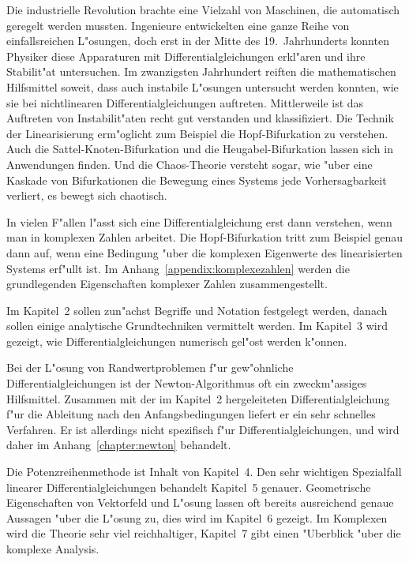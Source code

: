 Die industrielle Revolution brachte eine Vielzahl von Maschinen,
%
die automatisch geregelt werden mussten.
Ingenieure entwickelten eine ganze Reihe von einfallsreichen L"osungen,
doch erst in der Mitte des 19.~Jahrhunderts konnten Physiker diese
Apparaturen mit Differentialgleichungen erkl"aren und ihre Stabilit"at
untersuchen.
Im zwanzigsten Jahrhundert reiften die mathematischen Hilfsmittel
soweit, dass auch instabile L"osungen untersucht werden konnten,
wie sie bei nichtlinearen Differentialgleichungen auftreten.
Mittlerweile ist das Auftreten von Instabilit"aten recht gut verstanden
und klassifiziert. 
Die Technik der Linearisierung erm"oglicht zum Beispiel die
Hopf-Bifurkation zu verstehen.
%
%
Auch die Sattel-Knoten-Bifurkation und die Heugabel-Bifurkation
lassen sich in Anwendungen finden.
%
%
%
%
Und die Chaos-Theorie versteht sogar, wie "uber eine Kaskade von
Bifurkationen die Bewegung eines Systems jede Vorhersagbarkeit verliert,
es bewegt sich chaotisch.
%

In vielen F"allen l"asst sich eine Differentialgleichung erst dann
verstehen, wenn man in komplexen Zahlen arbeitet. 
Die Hopf-Bifurkation tritt zum Beispiel genau dann auf, wenn eine
Bedingung "uber die komplexen Eigenwerte des linearisierten Systems
erf"ullt ist.
Im Anhang~\ref{appendix:komplexezahlen} werden die grundlegenden Eigenschaften
komplexer Zahlen zusammengestellt.

Im Kapitel~2 sollen zun"achst Begriffe und Notation festgelegt werden,
danach sollen einige analytische Grundtechniken vermittelt werden.
Im Kapitel~3 wird gezeigt, wie Differentialgleichungen numerisch
gel"ost werden k"onnen.

Bei der L"osung von Randwertproblemen f"ur gew"ohnliche Differentialgleichungen
ist der Newton-Algorithmus oft ein zweckm"assiges Hilfsmittel.
Zusammen mit der im Kapitel~2 hergeleiteten Differentialgleichung f"ur
die Ableitung nach den Anfangsbedingungen liefert er ein sehr schnelles
Verfahren.
Er ist allerdings nicht spezifisch f"ur Differentialgleichungen, und
wird daher im Anhang~\ref{chapter:newton} behandelt.

Die Potenzreihenmethode ist Inhalt von Kapitel~4. 
Den sehr wichtigen Spezialfall linearer Differentialgleichungen
behandelt Kapitel~5 genauer.
Geometrische Eigenschaften von Vektorfeld und L"osung lassen oft
bereits ausreichend genaue Aussagen "uber die L"osung zu,  dies wird
im Kapitel~6 gezeigt.
Im Komplexen wird die Theorie sehr viel reichhaltiger, Kapitel~7 gibt
einen "Uberblick "uber die komplexe Analysis.

